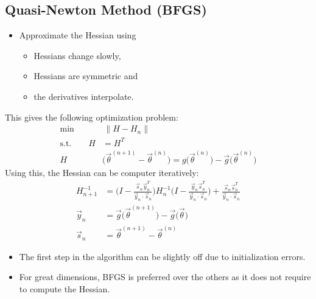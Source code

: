 		\subsection{Quasi-Newton Method (BFGS)}
			\begin{itemize}
				\item Approximate the Hessian using
					\begin{itemize}
						\item Hessians change slowly,
						\item Hessians are symmetric and
						\item the derivatives interpolate.
					\end{itemize}
			\end{itemize}
			This gives the following optimization problem:
			\begin{align}
				\min \, & \, \lVert H - H_n \rVert                                                                                                    \\
				\textrm{s.t.} \qquad
				H       & = H^T                                                                                                                       \\
				H       & \big(\vec{\theta}^{(n + 1)} - \vec{\theta}^{(n)}\big) = g\big(\vec{\theta}^{(n)}\big) - \vec{g}\big(\vec{\theta}^{(n)}\big)
			\end{align}
			Using this, the Hessian can be computer iteratively:
			\begin{align}
				H_{n + 1}^{-1} & = \Bigg( I - \frac{\vec{s}_n \vec{y}_n^T}{\vec{y}_n \cdot \vec{s}_n} \Bigg) H_n^{-1}
				\Bigg( I - \frac{\vec{y}_n \vec{s}_n^T}{\vec{y}_n \cdot \vec{s}_n} \Bigg)
				+ \frac{\vec{s}_n \vec{s}_n^T}{\vec{y}_n \cdot \vec{s}_n}                                             \\
				\vec{y}_n      & = \vec{g}\big(\vec{\theta}^{(n + 1)}\big) - \vec{g}\big(\vec{\theta}\big)            \\
				\vec{s}_n      & = \vec{\theta}^{(n + 1)} - \vec{\theta}^{(n)}
			\end{align}

			\begin{itemize}
				\item The first step in the algorithm can be slightly off due to initialization errors.
				\item For great dimensions, BFGS is preferred over the others as it does not require to compute the Hessian.
			\end{itemize}

